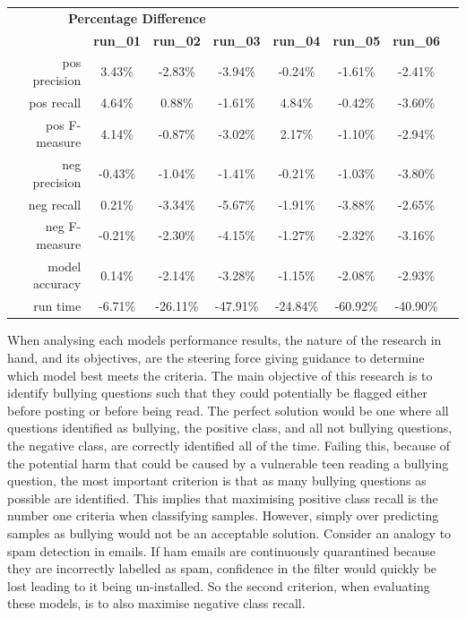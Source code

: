\begin{table}[h]
\begin{tabular}{rccccccc}
	\multicolumn{4}{c}{\textbf{Percentage Difference}} \\
	\cmidrule(r){1-4}
	 & \textbf{run\_01} & \textbf{run\_02} & \textbf{run\_03} & \textbf{run\_04} & \textbf{run\_05} & \textbf{run\_06} \\
	\midrule
	pos precision & 3.43\% & -2.83\% & -3.94\% & -0.24\% & -1.61\% & -2.41\% \\
	pos recall & 4.64\% & 0.88\% & -1.61\% & 4.84\% & -0.42\% & -3.60\% \\
	pos F-measure & 4.14\% & -0.87\% & -3.02\% & 2.17\% & -1.10\% & -2.94\% \\
	neg precision & -0.43\% & -1.04\% & -1.41\% & -0.21\% & -1.03\% & -3.80\% \\
	neg recall & 0.21\% & -3.34\% & -5.67\% & -1.91\% & -3.88\% & -2.65\% \\
	neg F-measure & -0.21\% & -2.30\% & -4.15\% & -1.27\% & -2.32\% & -3.16\% \\
	model accuracy & 0.14\% & -2.14\% & -3.28\% & -1.15\% & -2.08\% & -2.93\% \\
	run time & -6.71\% & -26.11\% & -47.91\% & -24.84\% & -60.92\% & -40.90\% \\
	\bottomrule
\end{tabular}
\end{table}

When analysing each models performance results, the nature of the research in hand, and its objectives, are the steering force giving guidance to determine which model best meets the criteria. The main objective of this research is to identify bullying questions such that they could potentially be flagged either before posting or before being read. The perfect solution would be one where all questions identified as bullying, the positive class, and all not bullying questions, the negative class, are correctly identified all of the time. Failing this, because of the potential harm that could be caused by a vulnerable teen reading a bullying question, the most important criterion is that as many bullying questions as possible are identified. This implies that maximising positive class recall is the number one criteria when classifying samples. However, simply over predicting samples as bullying would not be an acceptable solution. Consider an analogy to spam detection in emails. If ham emails are continuously quarantined because they are incorrectly labelled as spam, confidence in the filter would quickly be lost leading to it being un-installed. So the second criterion, when evaluating these models, is to also maximise negative class recall.

